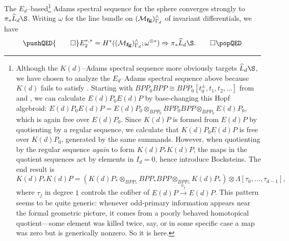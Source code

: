 \begin{theorem}\label{ASSForLKdS}
The \(E_d\)--based\footnote{Although the \(K(d)\)--Adams spectral sequence more obviously targets \(\widehat L_d \S\), we have chosen to analyze the \(E_d\)--Adams spectral sequence above because \(K(d)\) fails to satisfy {\CH}.  Starting with \(BPP_0 BPP \cong BPP_0[t_0^{\pm}, t_1, t_2, \ldots]\) from  and , we can calculate \(E(d)P_0 E(d)P\) by base-changing this Hopf algebroid: \(E(d)P_0 E(d)P = E(d)P_0 \otimes_{BPP_0} BPP_0 BPP \otimes_{BPP_0} E(d)P_0\), which is again free over \(E(d)P_0\).  Since \(K(d)P\) is formed from \(E(d)P\) by quotienting by a regular sequence, we calculate that \(K(d)P_0 E(d)P\) is free over \(K(d)P_0\), generated by the same summands.  However, when quotienting by the regular sequence \emph{again} to form \(K(d)P_* K(d)P\), the maps in the quotient sequences act by elements in \(I_d = 0\), hence introduce Bocksteins.  The end result is \[K(d)P_* K(d)P = \left(K(d)P_* \otimes_{BPP_*} BPP_* BPP \otimes_{BPP_*} K(d)P_*\right) \otimes \Lambda[\tau_0, \ldots, \tau_{d-1}],\] where \(\tau_j\) in degree \(1\) controls the cofiber of \(E(d)P \xrightarrow{v_j} E(d)P\).  This pattern seems to be quite generic: whenever odd-primary information appears near the formal geometric picture, it comes from a poorly behaved homotopical quotient---some element was killed twice, say, or in some specific case a map was zero but is generically nonzero.  So it is here.}
Adams spectral sequence for the sphere converges strongly to \(\pi_* \widehat L_d \S\).  Writing \(\omega\) for the line bundle on \((\mathcal{M}_{\mathbf{fg}})^\wedge_{\Gamma_d}\) of invariant differentials, we have
\[\pushQED{\qed}
E_2^{*, *} = H^*((\moduli{fg})^\wedge_{\Gamma_d}; \omega^{\otimes *}) \Rightarrow \pi_* \widehat L_d \S. \qedhere
\popQED\]
\end{theorem}


